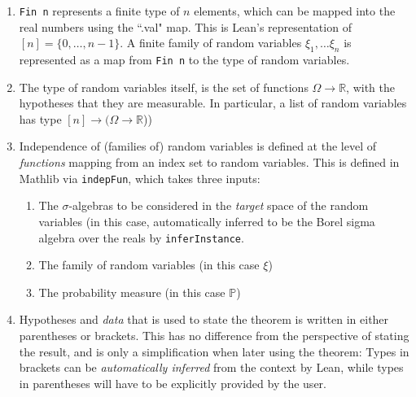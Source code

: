 \documentclass[11pt]{amsart}
\numberwithin{equation}{section}
\theoremstyle{definition}
\theoremstyle{remark}
\begin{document}
\begin{enumerate}
    \item {\scriptsize \texttt{Fin n}} represents a finite type of $n$ elements, which can be mapped into the real numbers using the ``.val" map. This is Lean's representation of $[n]=\{0,\dots, n-1\}$. A finite family of random variables $\xi_1, \dots \xi_n$ is represented as a map from {\scriptsize \texttt{Fin n}} to the type of random variables.
    \item The type of random variables itself, is the set of functions $\Omega \to \mathbb R$, with the hypotheses that they are measurable. In particular, a list of random variables has type $[n]\to(\Omega \to \mathbb R$))
    \item Independence of (families of) random variables is defined at the level of \textit{functions} mapping from an index set to  random variables. This is defined in Mathlib via {\scriptsize \texttt{indepFun}}, which takes three inputs: 
    \begin{enumerate}
        \item The $\sigma$-algebras to be considered in the \textit{target} space of the random variables (in this case, automatically inferred to be the Borel sigma algebra over the reals by {\scriptsize \texttt{inferInstance}}.
        \item The family of random variables (in this case $\xi$)
        \item The probability measure (in this case $\mathbb P$)
    \end{enumerate}
    \item Hypotheses and \textit{data} that is used to state the theorem is written in either parentheses or brackets. This has no difference from the perspective of stating the result, and is only a simplification when later using the theorem: Types in brackets can be \textit{automatically inferred} from the context by Lean, while types in parentheses will have to be explicitly provided by the user.
    
\end{enumerate}
\end{document}
